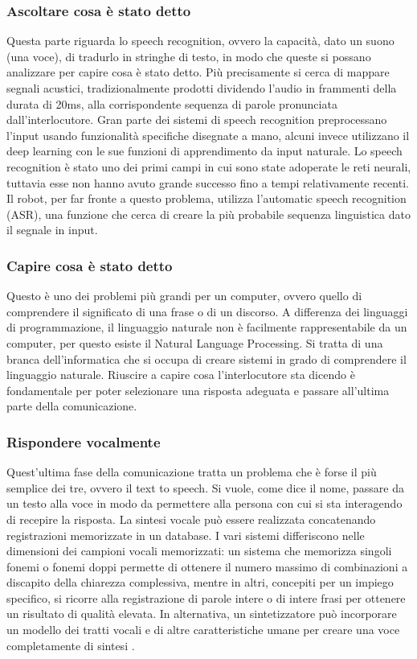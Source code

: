 \documentclass[italian, twoside]{sapthesis} %
\begin{document}
\subsubsection{Ascoltare cosa è stato detto}
Questa parte riguarda lo speech recognition, ovvero la capacità, dato un suono (una voce), di tradurlo in stringhe di testo, in modo che queste si possano analizzare per capire cosa è stato detto. Più precisamente si cerca di mappare segnali acustici, tradizionalmente prodotti dividendo l’audio in frammenti della durata di 20ms, alla corrispondente sequenza di parole pronunciata dall’interlocutore. Gran parte dei sistemi di speech recognition preprocessano l’input usando funzionalità specifiche disegnate a mano, alcuni invece utilizzano il deep learning con le sue funzioni di apprendimento da input naturale. Lo speech recognition è stato uno dei primi campi in cui sono state adoperate le reti neurali, tuttavia esse non hanno avuto grande successo fino a tempi relativamente recenti. Il robot, per far fronte a questo problema, utilizza l’automatic speech recognition (ASR), una funzione che cerca di creare la più probabile sequenza linguistica dato il segnale in input.

\subsubsection{Capire cosa è stato detto}
Questo è uno dei problemi più grandi per un computer, ovvero quello di comprendere il significato di una frase o di un discorso. A differenza dei linguaggi di programmazione, il linguaggio naturale non è facilmente rappresentabile da un computer, per questo esiste il Natural Language Processing. Si tratta di una branca dell’informatica che si occupa di creare sistemi in grado di comprendere il linguaggio naturale. Riuscire a capire cosa l’interlocutore sta dicendo è fondamentale per poter selezionare una risposta adeguata e passare all’ultima parte della comunicazione.

\subsubsection{Rispondere vocalmente}
Quest’ultima fase della comunicazione tratta un problema che è forse il più semplice dei tre, ovvero il text to speech. Si vuole, come dice il nome, passare da un testo alla voce in modo da permettere alla persona con cui si sta interagendo di recepire la risposta. La sintesi vocale può essere realizzata concatenando registrazioni memorizzate in un database. I vari sistemi differiscono nelle dimensioni dei campioni vocali memorizzati: un sistema che memorizza singoli fonemi o fonemi doppi permette di ottenere il numero massimo di combinazioni a discapito della chiarezza complessiva, mentre in altri, concepiti per un impiego specifico, si ricorre alla registrazione di parole intere o di intere frasi per ottenere un risultato di qualità elevata. In alternativa, un sintetizzatore può incorporare un modello dei tratti vocali e di altre caratteristiche umane per creare una voce completamente di sintesi \cite{acero2000overview}.
\end{document}

